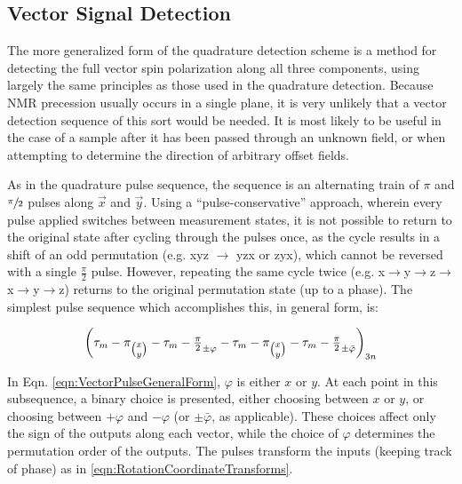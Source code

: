 \documentclass[PaulGanssle-Thesis.tex]{subfiles}
\begin{document}
\subsection{Vector Signal Detection}
\label{nmr.signal.magnetization.vector}
The more generalized form of the quadrature detection scheme is a method for detecting the full vector spin polarization along all three components, using largely the same principles as those used in the quadrature detection. Because NMR precession usually occurs in a single plane, it is very unlikely that a vector detection sequence of this sort would be needed. It is most likely to be useful in the case of a sample after it has been passed through an unknown field, or when attempting to determine the direction of arbitrary offset fields.

As in the quadrature pulse sequence, the sequence is an alternating train of $\pi$ and $\sfrac{\pi}{2}$ pulses along $\vec{x}$ and $\vec{y}$. Using a ``pulse-conservative'' approach, wherein every pulse applied switches between measurement states, it is not possible to return to the original state after cycling through the pulses once, as the cycle results in a shift of an  odd permutation (e.g. xyz $\rightarrow$ yzx or zyx), which cannot be reversed with a single $\tfrac{\pi}{2}$ pulse. However, repeating the same cycle twice (e.g. x$\rightarrow$y$\rightarrow$z$\rightarrow$x$\rightarrow$y$\rightarrow$z) returns to the original permutation state (up to a phase). The simplest pulse sequence which accomplishes this, in general form, is:

\begin{equation}
\label{eqn:VectorPulseGeneralForm}
\left(\tau_m-\pi_{\tbinom{x}{y}}-\tau_m-\tfrac{\pi}{2}_{\pm\varphi}-\tau_m-\pi_{\tbinom{x}{y}}-\tau_m-\tfrac{\pi}{2}_{\pm\bar{\varphi}}\right)_{3n}
\end{equation}

In Eqn. \ref{eqn:VectorPulseGeneralForm}, $\varphi$ is either $x$ or $y$. At each point in this subsequence, a binary choice is presented, either choosing between $x$ or $y$, or choosing between $+\varphi$ and $-\varphi$ (or $\pm\bar{\varphi}$, as applicable). These choices affect only the sign of the outputs along each vector, while the choice of $\varphi$ determines the permutation order of the outputs. The pulses transform the inputs (keeping track of phase) as in \ref{eqn:RotationCoordinateTransforms}.
\end{document}
